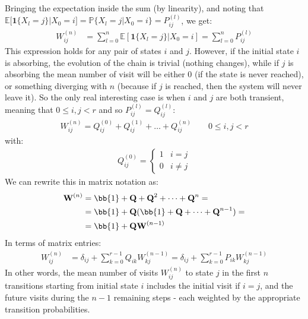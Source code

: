\documentclass[../template.tex]{subfiles}
\begin{document}
Bringing the expectation inside the sum (by linearity), and noting that $\mathbb{E}[\textbf{1}\{X_l = j\}|X_0 = i] = \mathbb{P}\{X_l = j|X_0 = i\} = P_{ij}^{(l)}$, we get:
\begin{align}\label{eqn:Wijn}
    W_{ij}^{(n)} &= \sum_{l=0}^n \mathbb{E}[\textbf{1}\{X_l = j\}|X_0 = i] = \sum_{l=0}^n P_{ij}^{(l)}
\end{align}
This expression holds for any pair of states $i$ and $j$. However, if the initial state $i$ is absorbing, the evolution of the chain is trivial (nothing changes), while if $j$ is absorbing the mean number of visit will be either $0$ (if the state is never reached), or something diverging with $n$ (because if $j$ is reached, then the system will never leave it). So the only real interesting case is when $i$ and $j$ are both transient, meaning that $0 \leq i,j < r$ and so $P_{ij}^{(l)} = Q_{ij}^{(l)}$:
\begin{align*}
    W_{ij}^{(n)} = Q_{ij}^{(0)} + Q_{ij}^{(1)} + \dots + Q_{ij}^{(n)} \qquad 0\leq i, j < r
\end{align*}
with:
\begin{align*}
    Q_{ij}^{(0)} = \begin{cases}
        1 & i = j\\
        0 & i \neq j
    \end{cases}
\end{align*}
We can rewrite this in matrix notation as:
\begin{align}\label{eqn:W-n2}
    \textbf{W}^{(n)} &= \bb{1} + \textbf{Q} + \textbf{Q}^2 + \dots + \textbf{Q}^n =\\ \nonumber
    &= \bb{1} + \textbf{Q}(\bb{1} + \textbf{Q} + \dots + \textbf{Q}^{n-1}  )    =\\
    &= \bb{1} + \textbf{QW}^{(n-1)}  \label{eqn:matrix-rec}
\end{align}
In terms of matrix entries:
\begin{align*}
    W_{ij}^{(n)} &= \delta_{ij} + \sum_{k=0}^{r-1} Q_{ik} W_{kj}^{(n-1)} = \delta_{ij} + \sum_{k=0}^{r-1} P_{ik} W_{kj}^{(n-1)}
\end{align*}
In other words, the mean number of visits $W_{ij}^{(n)}$ to state $j$ in the first $n$ transitions starting from initial state $i$ includes the initial visit if $i = j$, and the future visits during the $n-1$ remaining steps - each weighted by the appropriate transition probabilities.

\medskip
\end{document}
